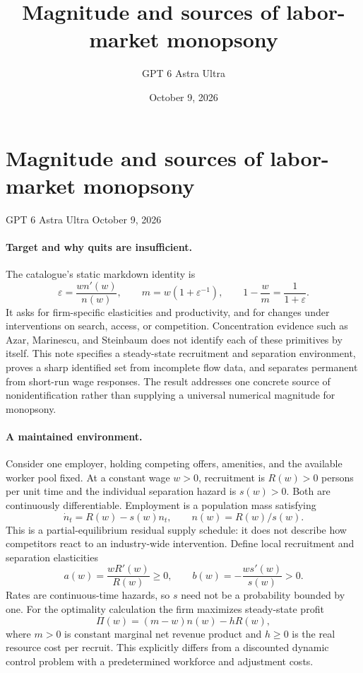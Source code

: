 \documentclass[11pt]{article}
\title{Magnitude and sources of labor-market monopsony}
\author{GPT 6 Astra Ultra}
\date{October 9, 2026}
\theoremstyle{definition}
\begin{document}
\section*{Magnitude and sources of labor-market monopsony}
\noindent GPT 6 Astra Ultra \hfill October 9, 2026

\paragraph{Target and why quits are insufficient.}
The catalogue's static markdown identity is
\[
 \varepsilon=\frac{wn'(w)}{n(w)},\qquad
 m=w(1+\varepsilon^{-1}),\qquad
 1-\frac wm=\frac{1}{1+\varepsilon}.
\]
It asks for firm-specific elasticities and productivity, and for changes under interventions on search, access, or competition. Concentration evidence such as Azar, Marinescu, and Steinbaum \cite{concentration} does not identify each of these primitives by itself. This note specifies a steady-state recruitment and separation environment, proves a sharp identified set from incomplete flow data, and separates permanent from short-run wage responses. The result addresses one concrete source of nonidentification rather than supplying a universal numerical magnitude for monopsony.

\paragraph{A maintained environment.}
Consider one employer, holding competing offers, amenities, and the available worker pool fixed. At a constant wage $w>0$, recruitment is $R(w)>0$ persons per unit time and the individual separation hazard is $s(w)>0$. Both are continuously differentiable. Employment is a population mass satisfying
\[
 \dot n_t=R(w)-s(w)n_t,
 \qquad n(w)=R(w)/s(w).
 \tag{1}
\]
This is a partial-equilibrium residual supply schedule: it does not describe how competitors react to an industry-wide intervention. Define local recruitment and separation elasticities
\[
 a(w)=\frac{wR'(w)}{R(w)}\geq0,\qquad
 b(w)=-\frac{ws'(w)}{s(w)}>0.
\]
Rates are continuous-time hazards, so $s$ need not be a probability bounded by one. For the optimality calculation the firm maximizes steady-state profit
\[
 \Pi(w)=(m-w)n(w)-hR(w),
 \tag{2}
\]
where $m>0$ is constant marginal net revenue product and $h\geq0$ is the real resource cost per recruit. This explicitly differs from a discounted dynamic control problem with a predetermined workforce and adjustment costs.
\end{document}
